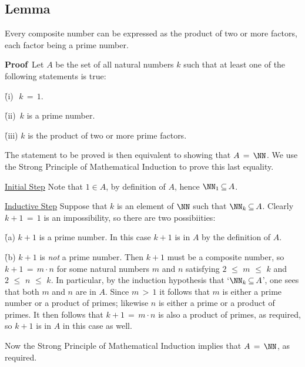 \V

            \subsection{\small{\bf Lemma}}
            \label{LemmaA20.04C}

\V

        Every composite number can be expressed as the product of two or more factors, each factor being a prime number.

\V

        {\bf Proof}\,  Let $A$ be the set of all natural numbers $k$ such that at least one of the following statements is true:

        \h  (i)\,\, $k \,=\, 1$.

        \h (ii)\, $k$ is a prime number.

        \h (iii) $k$ is the product of two or more prime factors.

\noindent The statement to be proved is then equivalent to showing that $A \,=\, {\NN}$.
    We use the Strong Principle of Mathematical Induction to prove this last equality.

        \underline{Initial Step} Note that $1{\in}A$, by definition of $A$, hence ${\NN}_{1} \,{\subseteq}\, A$.

        \underline{Inductive Step} Suppose that $k$ is an element of ${\NN}$ such that ${\NN}_{k} \,{\subseteq}\, A$.
    Clearly $k+1 \,=\, 1$ is an impossibility, so there are two possibiities:

       \h (a) $k+1$ is a prime number. In this case $k+1$ is in $A$ by the definition of $A$.

       \h (b) $k+1$ is {\em not} a prime number. Then $k+1$ must be a composite number, so $k+1 \,=\, m{\cdot}n$ for some natural numbers $m$ and $n$ satisfying $2\,\,{\leq}\,\,m\,\,{\leq}\,\,k$ and $2\,\,{\leq}\,\,n\,\,{\leq}\,\,k$.
    In particular, by the induction hypothesis that `${\NN}_{k} \,{\subseteq}\, A$', one sees that both $m$ and $n$ are in $A$.
    Since $m\,>\,1$ it follows that $m$ is either a prime number or a product of primes; likewise $n$ is either a prime or a product of primes.
    It then follows that $k+1 \,=\, m{\cdot}n$ is also a product of primes, as required, so $k+1$ is in $A$ in this case as well.

        Now the Strong Principle of Mathematical Induction implies that $A \,=\, {\NN}$, as required.

\V

